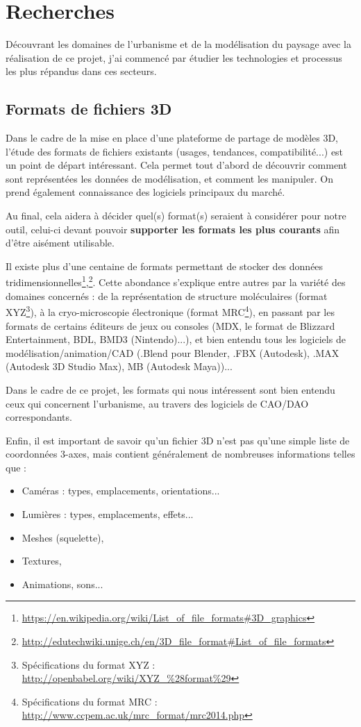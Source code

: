 \chapter{Recherches}
\label{Chapter2}

Découvrant les domaines de l'urbanisme et de la modélisation du paysage avec la réalisation de ce projet, j'ai commencé par étudier les technologies et processus les plus répandus dans ces secteurs.

\section{Formats de fichiers 3D}

Dans le cadre de la mise en place d'une plateforme de partage de modèles 3D, l'étude des formats de fichiers existants (usages, tendances, compatibilité...) est un point de départ intéressant. Cela permet tout d'abord de découvrir comment sont représentées les données de modélisation, et comment les manipuler. On prend également connaissance des logiciels principaux du marché.

Au final, cela aidera à décider quel(s) format(s) seraient à considérer pour notre outil, celui-ci devant pouvoir \textbf{supporter les formats les plus courants} afin d'être aisément utilisable.

Il existe plus d'une centaine de formats permettant de stocker des données tridimensionnelles\footnote{\url{https://en.wikipedia.org/wiki/List_of_file_formats\#3D_graphics}},\footnote{\url{http://edutechwiki.unige.ch/en/3D_file_format\#List_of_file_formats}}. 
Cette abondance s'explique entre autres par la variété des domaines concernés : de la représentation de structure moléculaires (format XYZ\footnote{Spécifications du format XYZ : \url{http://openbabel.org/wiki/XYZ_\%28format\%29}}), à la cryo-microscopie électronique (format MRC\footnote{Spécifications du format MRC : \url{http://www.ccpem.ac.uk/mrc_format/mrc2014.php}}), en passant par les formats de certains éditeurs de jeux ou consoles (MDX, le format de Blizzard Entertainment, BDL, BMD3 (Nintendo)...), et bien entendu tous les logiciels de modélisation/animation/CAD (.Blend pour Blender, .FBX (Autodesk), .MAX (Autodesk 3D Studio Max), MB (Autodesk Maya))...

Dans le cadre de ce projet, les formats qui nous intéressent sont bien entendu ceux qui concernent l'urbanisme, au travers des logiciels de CAO/DAO correspondants.

Enfin, il est important de savoir qu'un fichier 3D n'est pas qu'une simple liste de coordonnées 3-axes, mais contient généralement de nombreuses informations telles que : 
\begin{itemize}
    \item Caméras : types, emplacements, orientations...
    \item Lumières : types, emplacements, effets...
    \item Meshes (squelette),
    \item Textures,
    \item Animations, sons...
\end{itemize}

